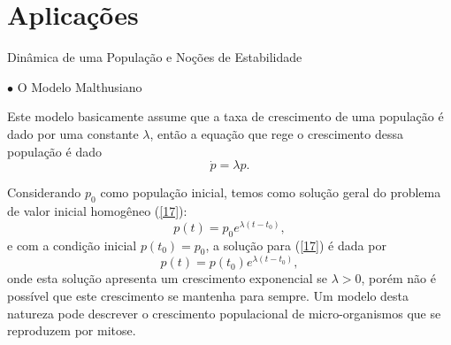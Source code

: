\documentclass[blue]{beamer}
\numberwithin{equation}{section}
\begin{document}
\section{Aplicações}
\begin{frame}{Dinâmica de uma População e Noções de Estabilidade}
\justifying


\begin{flushleft}
	$\bullet$ O Modelo Malthusiano
\end{flushleft}
\hspace{0.2cm} Este modelo basicamente assume que a taxa de crescimento de uma população é dado por uma constante $\lambda$, então a equação que rege o crescimento dessa população é dado
\begin{equation} \label{17} 
\dot{p} = \lambda p.
\end{equation}

\end{frame}

\begin{frame}
\justifying
\hspace{0.2cm} Considerando $p_0$ como população inicial, temos como solução geral do problema de valor inicial homogêneo (\ref{17}):
$$p(t)= p_0 e^{\lambda(t-t_0)},$$
e com a condição inicial $p(t_0) = p_0$, a solução para (\ref{17}) é dada por
$$p(t) = p(t_0)e^{\lambda(t-t_0)},$$
onde esta solução apresenta um crescimento exponencial se $\lambda > 0$, porém não é possível que este crescimento se mantenha para sempre. Um modelo desta natureza pode descrever o crescimento populacional de micro-organismos que se reproduzem por mitose. 

\end{frame}
\end{document}
